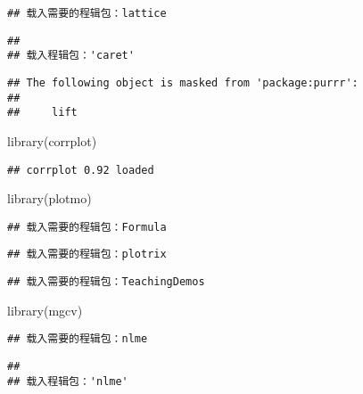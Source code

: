 \documentclass[
]{article}
\newenvironment{Shaded}{\begin{snugshade}}{\end{snugshade}}
\newcommand{\FunctionTok}[1]{\textcolor[rgb]{0.00,0.00,0.00}{#1}}
\newcommand{\NormalTok}[1]{#1}
\begin{document}
\begin{verbatim}
## 载入需要的程辑包：lattice
\end{verbatim}

\begin{verbatim}
## 
## 载入程辑包：'caret'
\end{verbatim}

\begin{verbatim}
## The following object is masked from 'package:purrr':
## 
##     lift
\end{verbatim}

\begin{Shaded}
\begin{Highlighting}[]
\FunctionTok{library}\NormalTok{(corrplot)}
\end{Highlighting}
\end{Shaded}

\begin{verbatim}
## corrplot 0.92 loaded
\end{verbatim}

\begin{Shaded}
\begin{Highlighting}[]
\FunctionTok{library}\NormalTok{(plotmo)}
\end{Highlighting}
\end{Shaded}

\begin{verbatim}
## 载入需要的程辑包：Formula
\end{verbatim}

\begin{verbatim}
## 载入需要的程辑包：plotrix
\end{verbatim}

\begin{verbatim}
## 载入需要的程辑包：TeachingDemos
\end{verbatim}

\begin{Shaded}
\begin{Highlighting}[]
\FunctionTok{library}\NormalTok{(mgcv)}
\end{Highlighting}
\end{Shaded}

\begin{verbatim}
## 载入需要的程辑包：nlme
\end{verbatim}

\begin{verbatim}
## 
## 载入程辑包：'nlme'
\end{verbatim}
\end{document}
